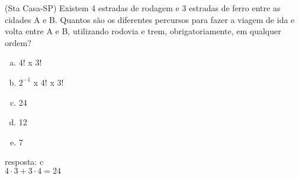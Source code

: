 \begin{ex}
 	(Sta Casa-SP) Existem 4 estradas de rodagem e 3 estradas de ferro entre as cidades A e B. Quantos são os diferentes percursos para fazer a viagem de ida e volta entre A e B, utilizando rodovia e trem, obrigatoriamente, em qualquer ordem?
    \begin{enumerate}[(a)]
    \item 4! x 3!
    \item $2 ^{-1}$ x 4! x 3!
    \item 24
    \item 12
    \item 7
    \end{enumerate}
      \begin{sol}
        resposta: c \\
        $4\cdot3 +3\cdot4=24$
      \end{sol}
\end{ex}